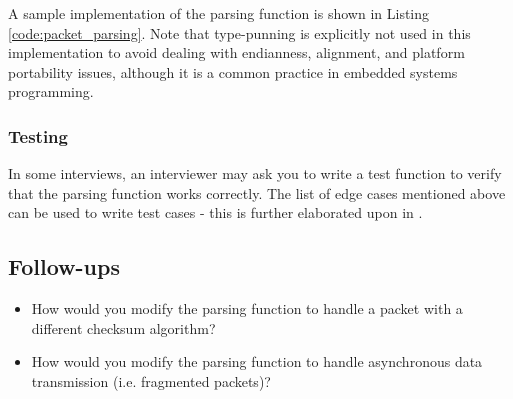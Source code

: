 \documentclass[main.tex]{subfiles}
\begin{document}
\noindent A sample implementation of the parsing function is shown in Listing \ref{code:packet_parsing}. Note that type-punning is explicitly not used in this implementation to avoid dealing with endianness, alignment, and platform portability issues, although it is a common practice in embedded systems programming.



\subsubsection{Testing}
In some interviews, an interviewer may ask you to write a test function to verify that the parsing function works correctly. The list of edge cases mentioned above can be used to write test cases - this is further elaborated upon in .

\subsection{Follow-ups}
\begin{itemize}
    \item How would you modify the parsing function to handle a packet with a different checksum algorithm?
    \item How would you modify the parsing function to handle asynchronous data transmission (i.e. fragmented packets)?
\end{itemize}
\end{document}
